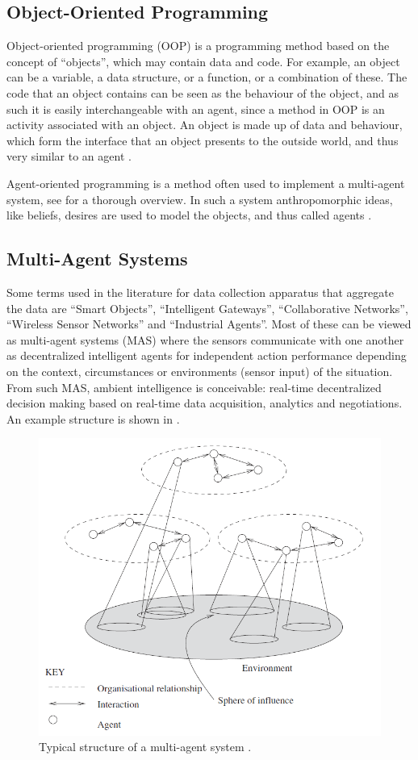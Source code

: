 \subsection{Object-Oriented Programming}

Object-oriented programming (OOP) is a programming method based on the concept of ``objects'', which may contain data and code. For example, an object can be a variable, a data structure, or a function, or a combination of these. The code that an object contains can be seen as the behaviour of the object, and as such it is easily interchangeable with an agent, since a method in OOP is an activity associated with an object. An object is made up of data and behaviour, which form the interface that an object presents to the outside world, and thus very similar to an agent \citep{shoham1993agent}.

Agent-oriented programming is a method often used to implement a multi-agent system, see \citep{mahar2012agent} for a thorough overview. In such a system anthropomorphic ideas, like beliefs, desires are used to model the objects, and thus called agents \citep{shoham1993agent}.

\subsection{Multi-Agent Systems}

Some terms used in the literature for data collection apparatus that aggregate the data are ``Smart Objects'', ``Intelligent Gateways'', ``Collaborative Networks'', ``Wireless Sensor Networks'' and ``Industrial Agents''. Most of these can be viewed as multi-agent systems (MAS) where the sensors communicate with one another as decentralized intelligent agents for independent action performance depending on the context, circumstances or environments (sensor input) of the situation. From such MAS, ambient intelligence  is conceivable: real-time decentralized decision making based on real-time data acquisition, analytics and negotiations. An example structure is shown in .

\begin{figure}[h]
	\centering
	\includegraphics[width=0.7\linewidth]{./img/MAS_example}
	\caption{Typical structure of a multi-agent system \citep{wooldridge2009introduction}.}
	\label{fig:MAS_example}
\end{figure}

